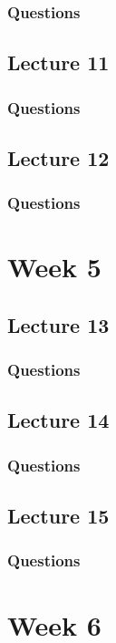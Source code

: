 \documentclass{report}
\begin{document}
\subsection*{Questions}
\qs{}{}

\newpage
\section{Lecture 11}
\subsection*{Questions}
\qs{}{}

\newpage
\section{Lecture 12}
\subsection*{Questions}
\qs{}{}

\chapter{Week 5}
\section{Lecture 13}
\subsection*{Questions}
\qs{}{}

\newpage
\section{Lecture 14}
\subsection*{Questions}
\qs{}{}

\newpage
\section{Lecture 15}
\subsection*{Questions}
\qs{}{}

\chapter{Week 6}
\end{document}
